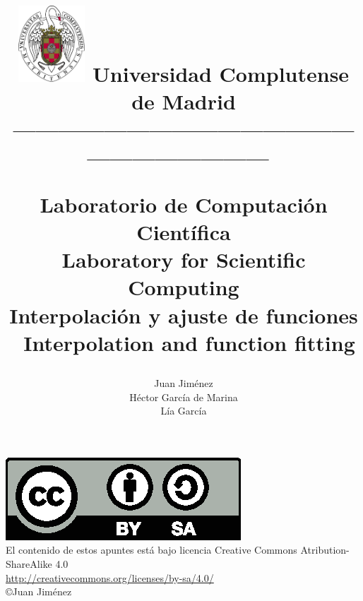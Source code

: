 \documentclass[a4paper,10pt]{book}
\begin{document}
\title{
\begin{flushleft}
\includegraphics[width=2.5cm]{ucm2.pdf}
Universidad Complutense de Madrid\\
---------------------------------------------------------------------\
\end{flushleft}
Laboratorio de Computaci\'on Cient\'ifica\\ Laboratory for Scientific Computing\\ Interpolación y ajuste de funciones \textreferencemark\ Interpolation and function fitting}
\author{ Juan Jim\'enez\\ H\'ector Garc\'ia de Marina\\ L\'ia Garc\'ia }
\maketitle
\vspace*{\fill}

\includegraphics[scale=1]{by-sa.eps}\\
El contenido de estos apuntes est\'a bajo licencia Creative Commons Atribution-ShareAlike 4.0\\
\href{http://creativecommons.org/licenses/by-sa/4.0/}{http://creativecommons.org/licenses/by-sa/4.0/}\\
\copyright Juan Jim\'enez

\bigskip
\tableofcontents
\listoffigures
\listoftables

%
%
%
%
%
%
%
%
%

%
%
%
\printindex
\printindex[eng]
\end{document}
